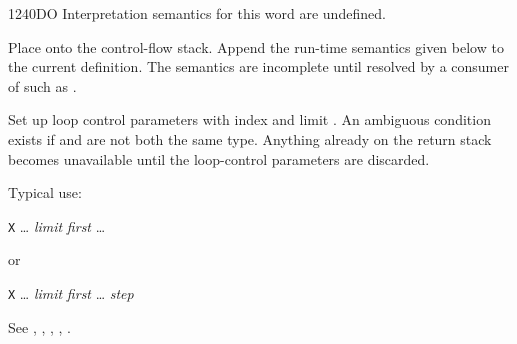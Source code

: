 \begin{worddef}{1240}{DO}
\interpret
	Interpretation semantics for this word are undefined.

\compile

	Place  onto the control-flow stack. Append the
	run-time semantics given below to the current definition. The
	semantics are incomplete until resolved by a consumer of
	 such as .

\runtime

	Set up loop control parameters with index  and
	limit . An ambiguous condition exists if
	 and  are not both the same
	type. Anything already on the return stack becomes unavailable
	until the loop-control parameters are discarded.


	\begin{rationale} %
		Typical use:

		\tab \word{:} \texttt{X} {\ldots}
			\emph{limit} \emph{first} 
				{\ldots}
		\word{;}

		or

		\tab \word{:} \texttt{X} {\ldots}
			\emph{limit} \emph{first} 
				{\ldots}
			\emph{step} 
		\word{;}
	\end{rationale}

	\begin{testing} %
		See ,
			,
			,
			,
			.
	\end{testing}
\end{worddef}

